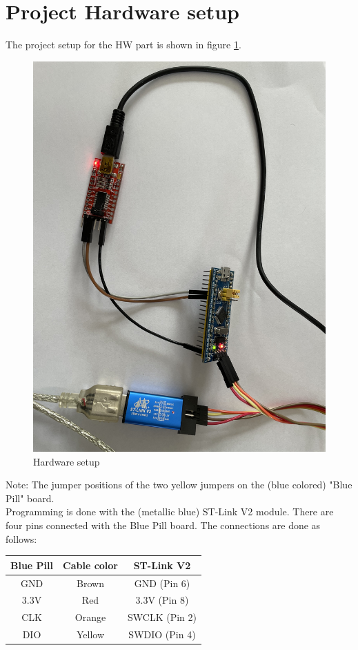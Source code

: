 \documentclass[11pt, oneside]{scrartcl}   	%
\begin{document}
\section{Project Hardware setup}
The project setup for the HW part is shown in figure \ref{fig:HWSetup}.
\begin{figure}[htbp]
	\centering
	\includegraphics[width=1.0\linewidth]{Figures/HardwareSetup_BluePill+STLinkV2+USBSerialAdapter.jpeg}
	\caption{Hardware setup}
	\label{fig:HWSetup}
\end{figure}

Note: The jumper positions of the two yellow jumpers on the (blue colored) "Blue Pill" board.\\

Programming is done with the (metallic blue) ST-Link V2 module. There are four pins connected with the Blue Pill board.
The connections are done as follows:
\begin{center}
\begin{tabular}{|c|c|c|}
	\hline
	\textbf{Blue Pill} & \textbf{Cable color} & \textbf{ST-Link V2} \\
	\hline
	GND & Brown & GND (Pin 6) \\
	\hline
	3.3V & Red & 3.3V (Pin 8) \\
	\hline
	CLK & Orange & SWCLK (Pin 2) \\
	\hline
	DIO & Yellow & SWDIO (Pin 4) \\
	\hline
\end{tabular}
\end{center}
\end{document}
